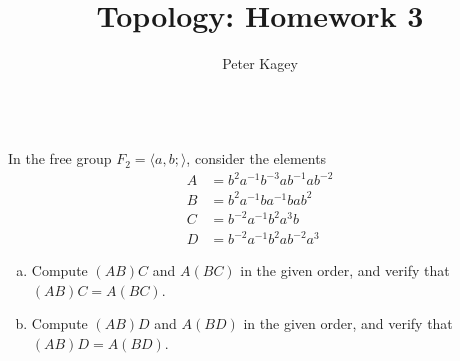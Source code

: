 \documentclass{article}
\newenvironment{problem}[2][Problem]{\begin{trivlist}
\item[\hskip \labelsep {\bfseries #1}\hskip \labelsep {\bfseries #2.}]}{\end{trivlist}}
\begin{document}
\title{Topology: Homework 3}
\author{Peter Kagey}

\maketitle

\begin{problem}{1} \text{} \\
  In the free group $F_2 = \langle a, b; \rangle$, consider the elements \begin{align*}
      A &= b^2 a^{-1} b^{-3} a b^{-1} a b^{-2} \\
      B &= b^2 a^{-1} b a^{-1} b a b^{2} \\
      C &= b^{-2} a^{-1} b^2 a^3 b \\
      D &= b^{-2} a^{-1} b^{2} a b^{-2} a^3
  \end{align*}
  \begin{enumerate}[(a)]
    \item Compute $(AB)C$ and $A(BC)$ in the given order, and verify that
      $(AB)C = A(BC)$.
    \item Compute $(AB)D$ and $A(BD)$ in the given order, and verify that
      $(AB)D = A(BD)$.
  \end{enumerate}
\end{problem}
\end{document}
